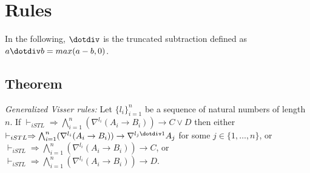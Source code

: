 \section{Rules} In the following, $\dotdiv$ is the truncated subtraction defined as $a \dotdiv b = max(a-b, 0)$.

\subsection{Theorem} \textit{Generalized Visser rules:} Let $\{ l_i \}_{i=1}^n$ be a sequence of natural numbers of length $n$. If $\vdash_{iSTL} \Rightarrow \bigwedge_{i=1}^n (\nabla^{l_i} (A_i \rightarrow B_i)) \rightarrow C \lor D$ then either $\vdash_{iSTL} \Rightarrow \bigwedge_{i=1}^n (\nabla^{l_i} (A_i \rightarrow B_i)) \rightarrow \nabla^{l_j \dotdiv 1} A_j$ for some $j \in \{ 1 , \dots , n \}$, or $\vdash_{iSTL} \Rightarrow \bigwedge_{i=1}^n (\nabla^{l_i} (A_i \rightarrow B_i)) \rightarrow C$, or $\vdash_{iSTL} \Rightarrow \bigwedge_{i=1}^n (\nabla^{l_i} (A_i \rightarrow B_i)) \rightarrow D$.

